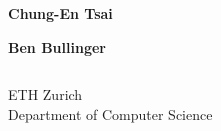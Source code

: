 \documentclass[11pt,aspectratio=169]{beamer}
\begin{document}
\begin{closingframe}

    \begin{center}
        \begin{minipage}{1\textwidth}
            \textbf{Chung-En Tsai}\hfill
            \textit{}
            
            \vspace{0.25em}
            
            \textbf{Ben Bullinger}\hfill\textit{}
        \end{minipage}
    \end{center}

    \vfill

    \begin{columns}
		\begin{column}{\textwidth}
            ETH Zurich\\
            Department of Computer Science
		\end{column}
	\end{columns}

\end{closingframe}
\end{document}
